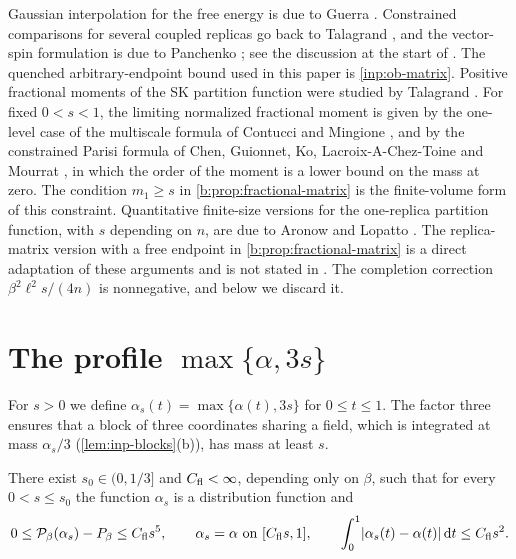 \begin{remark}\label{rem:fr-history}
Gaussian interpolation for the free energy is due to Guerra \cite{guerra-2003}. Constrained comparisons for several coupled replicas go back to Talagrand \cite{talagrand-2007}, and the vector-spin formulation is due to Panchenko \cite{panchenko-2018}; see the discussion at the start of \cite[Section~2]{oai-barriers}. The quenched arbitrary-endpoint bound used in this paper is \cref{inp:ob-matrix}. Positive fractional moments of the SK partition function were studied by Talagrand \cite{talagrand-2007-large-deviations}. For fixed $0<s<1$, the limiting normalized fractional moment is given by the one-level case of the multiscale formula of Contucci and Mingione \cite[Theorem~2.1]{contucci-mingione-2019}, and by the constrained Parisi formula of Chen, Guionnet, Ko, Lacroix-A-Chez-Toine and Mourrat \cite[Theorem~2.1]{chen-guionnet-ko-lacroix-mourrat-2026}, in which the order of the moment is a lower bound on the mass at zero. The condition $m_1\ge s$ in \cref{b:prop:fractional-matrix} is the finite-volume form of this constraint. Quantitative finite-size versions for the one-replica partition function, with $s$ depending on $n$, are due to Aronow and Lopatto \cite[Section~2.3]{quantitative-parisi}. The replica-matrix version with a free endpoint in \cref{b:prop:fractional-matrix} is a direct adaptation of these arguments and is not stated in \cite{oai-barriers}. The completion correction $\beta^2\ell^2s/(4n)$ is nonnegative, and below we discard it.
\end{remark}

\section{The profile \texorpdfstring{$\max\{\alpha,3s\}$}{max(alpha, 3s)}}\label{sec:fr-floor}

For $s>0$ we define $\alpha_s(t)=\max\{\alpha(t),3s\}$ for $0\le t\le1$. The factor three ensures that a block of three coordinates sharing a field, which is integrated at mass $\alpha_s/3$ (\cref{lem:inp-blocks}(b)), has mass at least $s$.

\begin{lemma}\label{lem:fr-floor}
There exist $s_0\in(0,1/3]$ and $C_{\rm fl}<\infty$, depending only on $\beta$, such that for every $0<s\le s_0$ the function $\alpha_s$ is a distribution function and
\begin{equation}\label{b:eq:specific-floor-cost}
 0\le\mathcal P_\beta(\alpha_s)-P_\beta\le C_{\rm fl}s^5,\qquad
 \alpha_s=\alpha\ \text{on }[C_{\rm fl}s,1],\qquad
 \int_0^1\lvert \alpha_s(t)-\alpha(t)\rvert\,\mathrm d t\le C_{\rm fl}s^2.
\end{equation}
\end{lemma}

